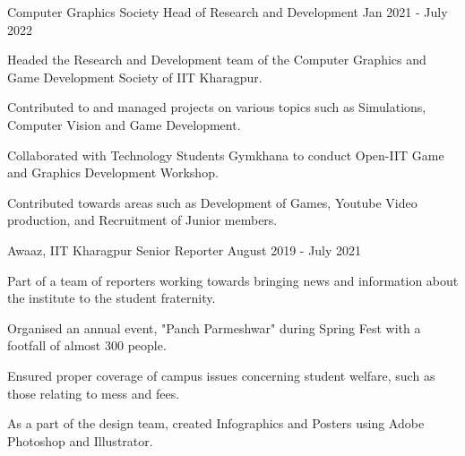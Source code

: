 

\begin{cventries}

  \cventry
    {Computer Graphics Society} %
    {Head of Research and Development} %
    {Jan 2021 - July 2022} %
    {} %
    {
      \begin{cvitems} %
        \item {Headed the Research and Development team of the Computer Graphics and Game Development Society of IIT Kharagpur.}
        \item {Contributed to and managed projects on various topics such as Simulations, Computer Vision and Game Development.}
        \item {Collaborated with Technology Students Gymkhana to conduct Open-IIT Game and Graphics Development Workshop.}
        \item {Contributed towards areas such as Development of Games, Youtube Video production, and Recruitment of Junior members.}
      \end{cvitems}
    }

  \cventry
    {Awaaz, IIT Kharagpur} %
    {Senior Reporter} %
    {August 2019 - July 2021} %
    {} %
    {
      \begin{cvitems} %
        \item {Part of a team of reporters working towards bringing news and information about the institute to the student fraternity.}
        \item {Organised an annual event, "Panch Parmeshwar" during Spring Fest with a footfall of almost 300 people.}
        \item {Ensured proper coverage of campus issues concerning student welfare, such as those relating to mess and fees.}
        \item {As a part of the design team, created Infographics and Posters using Adobe Photoshop and Illustrator.}
      \end{cvitems}
    }

\end{cventries}

